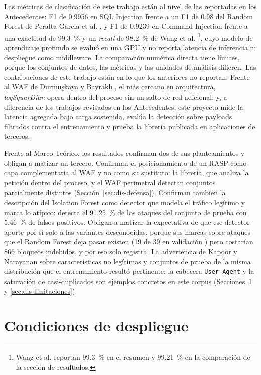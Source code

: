 Las métricas de clasificación de este trabajo están al nivel de las reportadas en los
Antecedentes: F1 de 0.9956 en SQL Injection frente a un F1 de 0.98 del Random Forest de Peralta-Garcia et al.
\cite{peralta2024sql}, y F1 de 0.9239 en Command Injection frente a una exactitud de 99.3~\% y un
\textit{recall} de 98.2~\% de Wang et al. \cite{seyyar2024}\footnote{Wang et al. reportan 99.3~\% en
el resumen y 99.21~\% en la comparación de la sección de resultados.}, cuyo modelo de aprendizaje
profundo se evaluó en una GPU y no reporta latencia de inferencia ni despliegue como middleware. La comparación numérica directa tiene límites, porque los
conjuntos de datos, las métricas y las unidades de análisis difieren. Las contribuciones de este
trabajo están en lo que los anteriores no reportan. Frente al WAF de Durmuşkaya y Bayraklı \cite{durmuskaya2025waf}, el más cercano en arquitectura, \textit{logSguarDian} opera dentro del proceso sin un salto de red
adicional; y, a diferencia de los trabajos revisados en los Antecedentes, este proyecto mide la latencia agregada
bajo carga sostenida, evalúa la detección sobre payloads filtrados contra el entrenamiento y prueba
la librería publicada en aplicaciones de terceros.

Frente al Marco Teórico, los resultados confirman dos de sus planteamientos y obligan a matizar un
tercero. Confirman el posicionamiento de un RASP como capa complementaria al WAF y no como su
sustituto: la librería, que analiza la petición dentro del proceso, y el WAF perimetral detectan
conjuntos parcialmente distintos (Sección~\ref{sec:dis-defensa}). Confirman también la descripción
del Isolation Forest como detector que modela el tráfico legítimo y marca lo atípico: detecta el
91.25~\% de los ataques del conjunto de prueba con 5.46~\% de falsos positivos. Obligan a matizar
la expectativa de que ese detector aporte por sí solo a las variantes desconocidas, porque sus
marcas sobre ataques que el Random Forest deja pasar existen (19 de 39 en validación \cite{valenzuela2026ia}) pero
costarían 866 bloqueos indebidos, y por eso solo registra. La advertencia de Kapoor y Narayanan
\cite{kapoor2023} sobre características no legítimas y conjuntos de prueba de la misma distribución
que el entrenamiento resultó pertinente: la cabecera \texttt{User-Agent} y la saturación de
casi-duplicados son ejemplos concretos en este corpus (Secciones~\ref{sec:dis-despliegue} y
\ref{sec:dis-limitaciones}).

\section{Condiciones de despliegue}
\label{sec:dis-despliegue}


